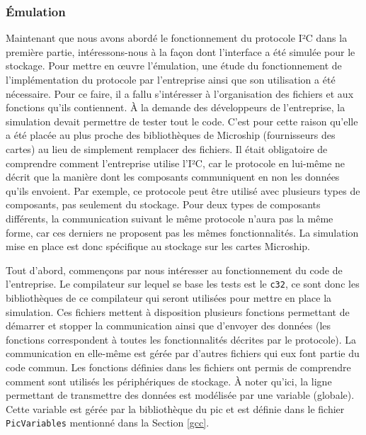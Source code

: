 \documentclass[a4paper]{article}
\begin{document}
\subsubsection*{Émulation}

Maintenant que nous avons abordé le fonctionnement du protocole I²C dans la
première partie, intéressons-nous à la façon dont l'interface a été simulée pour
le stockage. Pour mettre en œuvre l'émulation, une étude du fonctionnement de
l'implémentation du protocole par l'entreprise ainsi que son utilisation a été
nécessaire. Pour ce faire, il a fallu s'intéresser à l'organisation des
fichiers et aux fonctions qu'ils contiennent. À la demande des développeurs de
l'entreprise, la simulation devait permettre de tester tout le code. C'est pour
cette raison qu'elle a été placée au plus proche des bibliothèques de Microship
(fournisseurs des cartes) au lieu de simplement remplacer des fichiers. Il était
obligatoire de comprendre comment l'entreprise utilise l'I²C, car le protocole en
lui-même ne décrit que la manière dont les composants communiquent en non les
données qu'ils envoient. Par exemple, ce protocole peut être utilisé avec
plusieurs types de composants, pas seulement du stockage. Pour deux types de
composants différents, la communication suivant le même protocole n'aura pas la
même forme, car ces derniers ne proposent pas les mêmes fonctionnalités. La
simulation mise en place est donc spécifique au stockage sur les cartes
Microship.

Tout d'abord, commençons par nous intéresser au fonctionnement du code de
l'entreprise. Le compilateur sur lequel se base les tests est le \verb|c32|, ce
sont donc les bibliothèques de ce compilateur qui seront utilisées pour mettre
en place la simulation. Ces fichiers mettent à disposition plusieurs fonctions
permettant de démarrer et stopper la communication ainsi que d'envoyer des
données (les fonctions correspondent à toutes les fonctionnalités décrites par le
protocole). La communication en elle-même est gérée par d'autres fichiers qui
eux font partie du code commun. Les fonctions définies dans les fichiers ont
permis de comprendre comment sont utilisés les périphériques de stockage. À
noter qu'ici, la ligne permettant de transmettre des données est modélisée par
une variable (globale). Cette variable est gérée par la bibliothèque du
\gls{pic} et est définie dans le fichier \verb|PicVariables| mentionné dans la
Section \ref{gcc}.
\end{document}
